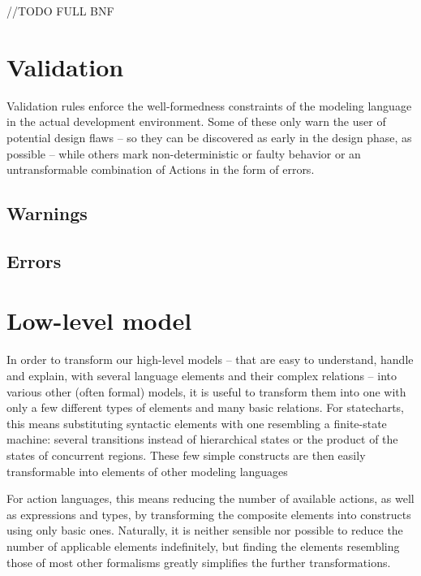 //TODO FULL BNF

\section{Validation} \label{section_tr_validation}
Validation rules enforce the well-formedness constraints of the modeling language in the actual development environment. Some of these only warn the user of potential design flaws -- so they can be discovered as early in the design phase, as possible -- while others mark non-deterministic or faulty behavior or an untransformable combination of Actions in the form of errors.

\subsection{Warnings}

\subsection{Errors}

\section{Low-level model} \label{section_tr_lowlevel}
In order to transform our high-level models -- that are easy to understand, handle and explain, with several language elements and their complex relations -- into various other (often formal) models, it is useful to transform them into one with only a few different types of elements and many basic relations. For statecharts, this means substituting syntactic elements with one resembling a finite-state machine: several transitions instead of hierarchical states or the product of the states of concurrent regions. These few simple constructs are then easily transformable into elements of other modeling languages

For action languages, this means reducing the number of available actions, as well as expressions and types, by transforming the composite elements into constructs using only basic ones. Naturally, it is neither sensible nor possible to reduce the number of applicable elements indefinitely, but finding the elements resembling those of most other formalisms greatly simplifies the further transformations. 

